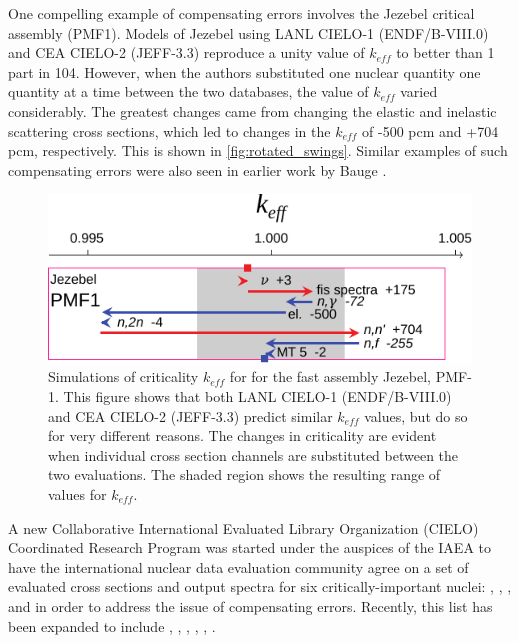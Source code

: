 \documentclass[letterpaper]{ar-1col}
\begin{document}
One compelling example of compensating errors involves the Jezebel  critical assembly (PMF1).  Models of Jezebel using LANL CIELO-1 (ENDF/B-VIII.0) and CEA CIELO-2 (JEFF-3.3) reproduce a unity value of $k_{eff}$ to better than 1 part in 104.  However, when the authors substituted one nuclear quantity one quantity at a time between the two databases, the value of $k_{eff}$ varied considerably.  The greatest changes came from changing the elastic and inelastic scattering cross sections, which led to changes in the $k_{eff}$ of -500 pcm and +704 pcm, respectively. This is shown in \autoref{fig:rotated_swings}.   Similar examples of such compensating errors were also seen in earlier work by Bauge \cite{Bau12}.  

\begin{figure}
 \centering
 \includegraphics[width=0.8\linewidth]{rotated_swings.pdf}

 \caption{Simulations of criticality $k_{eff}$ for  for the fast assembly Jezebel, PMF-1. This figure shows that both LANL CIELO-1 (ENDF/B-VIII.0) and CEA CIELO-2 (JEFF-3.3) predict similar $k_{eff}$ values, but do so for very different reasons. The changes in criticality are evident when individual cross section channels are substituted between the two evaluations.  The shaded region shows the  resulting range of values for $k_{eff}$.}
 \label{fig:rotated_swings}
\end{figure}

A new Collaborative International Evaluated Library Organization (CIELO) Coordinated Research Program was started under the auspices of the IAEA \cite{Cha18a} to have the international nuclear data evaluation community agree on a set of evaluated cross sections and output spectra for six critically-important nuclei: , , ,  and  in order to address the issue of compensating errors.  Recently, this list has been expanded to include , , , , , .
\end{document}
